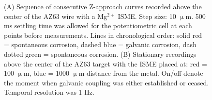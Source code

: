 \documentclass[3p]{elsarticle}
\begin{document}
\begin{figure}
\caption{(A) Sequence of consecutive Z-approach curves recorded above the center of the AZ63 wire with a Mg$^{2+}$ ISME. Step size: 10 $\upmu$m. 500 ms settling time was allowed for the potentiometric cell at each points before measurements. Lines in chronological order: solid red = spontaneous corrosion, dashed blue = galvanic corrosion, dash dotted green = spontaneous corrosion. (B) Stationary recordings above the center of the AZ63 target with the ISME placed at: red = 100 $\upmu$m, blue = 1000 $\upmu$m distance from the metal. On/off denote the moment when galvanic coupling was either established or ceased. Temporal resolution was 1 Hz.}
\label{fig:approach}
\end{figure}
\end{document}
